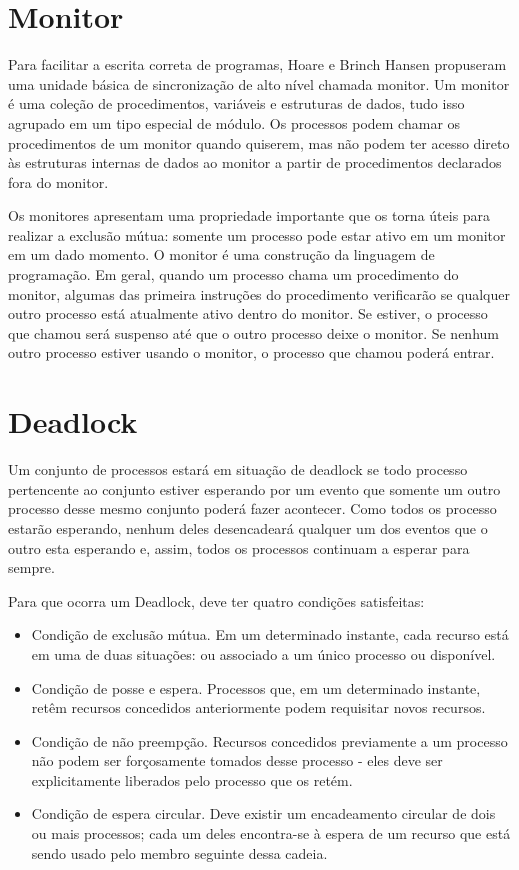 \section{Monitor}

Para facilitar a escrita correta de programas, Hoare e Brinch Hansen propuseram uma unidade 
básica de sincronização de alto nível chamada monitor.  Um monitor é uma coleção de procedimentos, 
variáveis e estruturas de dados, tudo isso agrupado em um tipo especial de módulo. Os processos 
podem chamar os procedimentos de um monitor quando quiserem, mas não podem ter acesso direto às 
estruturas internas de dados ao monitor a partir de procedimentos declarados fora do monitor.

Os monitores apresentam uma propriedade importante que os torna úteis para realizar a exclusão mútua: 
somente um processo pode estar ativo em um monitor em um dado momento. O monitor é uma construção da 
linguagem de programação. Em geral, quando um processo chama um procedimento do monitor, algumas das 
primeira instruções do procedimento verificarão  se qualquer outro processo está atualmente ativo 
dentro do monitor. Se estiver, o processo que chamou será suspenso até que o outro processo deixe o 
monitor. Se nenhum outro processo estiver usando o monitor, o processo que chamou poderá entrar.

\section{Deadlock}

Um conjunto de processos estará em situação de deadlock se todo processo pertencente ao conjunto 
estiver esperando por um evento que somente um outro processo desse mesmo conjunto poderá fazer 
acontecer. Como todos os processo estarão esperando, nenhum deles desencadeará qualquer um dos 
eventos que o outro esta esperando e, assim, todos os processos continuam a esperar para sempre.

Para que ocorra um Deadlock, deve ter quatro condições satisfeitas:

\begin{itemize}
\item Condição de exclusão mútua. Em um determinado instante, cada recurso está em uma de duas situações:
ou associado a um único processo ou disponível.
\item Condição de posse e espera. Processos que, em um determinado instante, retêm recursos concedidos
anteriormente podem requisitar novos recursos.
\item Condição de não preempção. Recursos concedidos previamente a um processo não podem ser 
forçosamente tomados desse processo - eles deve ser explicitamente liberados pelo processo que os retém.
\item Condição de espera circular. Deve existir um encadeamento circular de dois ou mais processos; cada um
deles encontra-se à espera de um recurso que está sendo usado pelo membro seguinte dessa cadeia.
\end{itemize}

